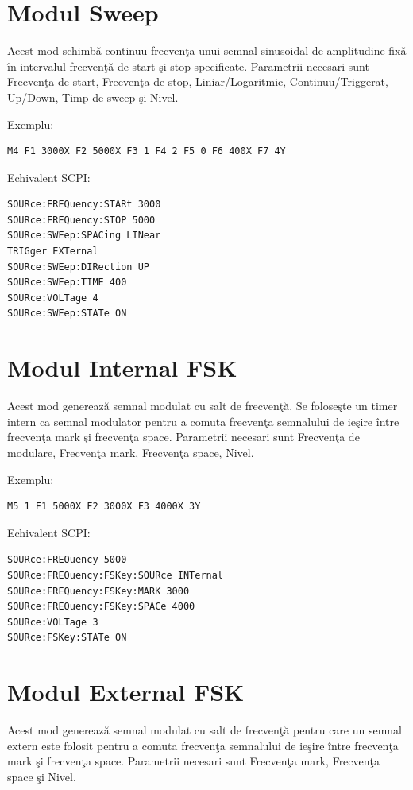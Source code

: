\section{Modul Sweep}
Acest mod schimb\u{a} continuu frecven\c{t}a unui semnal sinusoidal de amplitudine fix\u{a} \^{i}n intervalul frecven\c{t}\u{a} de start \c{s}i stop specificate. Parametrii necesari sunt Frecven\c{t}a de start, Frecven\c{t}a de stop, Liniar/Logaritmic, Continuu/Triggerat, Up/Down, Timp de sweep \c{s}i Nivel.

Exemplu:
\begin{verbatim}
M4 F1 3000X F2 5000X F3 1 F4 2 F5 0 F6 400X F7 4Y
\end{verbatim}

Echivalent SCPI:
\begin{verbatim}
SOURce:FREQuency:STARt 3000
SOURce:FREQuency:STOP 5000
SOURce:SWEep:SPACing LINear
TRIGger EXTernal
SOURce:SWEep:DIRection UP
SOURce:SWEep:TIME 400
SOURce:VOLTage 4
SOURce:SWEep:STATe ON
\end{verbatim}

\section{Modul Internal FSK}
Acest mod genereaz\u{a} semnal modulat cu salt de frecven\c{t}\u{a}. Se folose\c{s}te un timer intern ca semnal modulator pentru a comuta frecven\c{t}a semnalului de ie\c{s}ire \^{i}ntre frecven\c{t}a mark \c{s}i frecven\c{t}a space. Parametrii necesari sunt Frecven\c{t}a de modulare, Frecven\c{t}a mark, Frecven\c{t}a space, Nivel.

Exemplu:
\begin{verbatim}
M5 1 F1 5000X F2 3000X F3 4000X 3Y
\end{verbatim}

Echivalent SCPI:
\begin{verbatim}
SOURce:FREQuency 5000
SOURce:FREQuency:FSKey:SOURce INTernal
SOURce:FREQuency:FSKey:MARK 3000
SOURce:FREQuency:FSKey:SPACe 4000
SOURce:VOLTage 3
SOURce:FSKey:STATe ON
\end{verbatim}

\section{Modul External FSK}
Acest mod genereaz\u{a} semnal modulat cu salt de frecven\c{t}\u{a} pentru care un semnal extern este folosit pentru a comuta frecven\c{t}a semnalului de ie\c{s}ire \^{i}ntre frecven\c{t}a mark \c{s}i frecven\c{t}a space. Parametrii necesari sunt Frecven\c{t}a mark, Frecven\c{t}a space \c{s}i Nivel.

